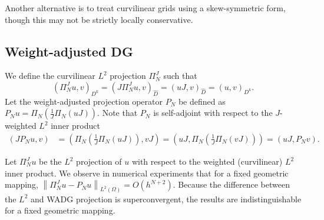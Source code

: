 \documentclass[preprint,10pt]{article}
\theoremstyle{definition}
\theoremstyle{lemma}
\theoremstyle{theorem}
\theoremstyle{assumption}
\renewcommand{\hat}{\widehat}
\newcommand{\nor}[1]{\left\| #1 \right\|}
\newcommand{\LRp}[1]{\left( #1 \right)}
\begin{document}
Another alternative is to treat curvilinear grids using a skew-symmetric form, though this may not be strictly locally conservative.  

\subsection{Weight-adjusted DG}


We define the curvilinear $L^2$ projection $\Pi_N^J$ such that
\[
\LRp{\Pi_N^J u,v}_{D^k} = \LRp{J \Pi_N^J u,v}_{\hat{D}} = \LRp{uJ,v}_{\hat{D}} = \LRp{u,v}_{D^k}.  
\]
Let the weight-adjusted projection operator $P_N$ be defined as $P_N u = \Pi_N\LRp{\frac{1}{J}\Pi_N\LRp{uJ}}$.  Note that $P_N$ is self-adjoint with respect to the $J$-weighted $L^2$ inner product
\begin{align*}
\LRp{J P_N u, v} &= \LRp{\Pi_N\LRp{\frac{1}{J}\Pi_N\LRp{uJ}}, vJ} = \LRp{uJ, \Pi_N\LRp{\frac{1}{J}\Pi_N\LRp{vJ}}} =  \LRp{uJ, P_N v}.
\end{align*}

Let $\Pi_N^J u$ be the $L^2$ projection of $u$ with respect to the weighted (curvilinear) $L^2$ inner product.  We observe in numerical experiments that for a fixed geometric mapping, $\nor{\Pi_N^J u - P_N u}_{L^2\LRp{\Omega}} = O(h^{N+2})$.  Because the difference between the $L^2$ and WADG projection is superconvergent, the results are indistinguishable for a fixed geometric mapping.  
\end{document}
